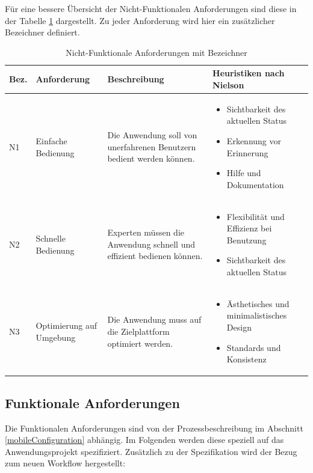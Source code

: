 Für eine bessere Übersicht der Nicht-Funktionalen Anforderungen sind diese in der Tabelle \ref{nonFunctionalRequ} dargestellt. Zu jeder Anforderung wird hier ein zusätzlicher Bezeichner definiert.

\begin{table}
\begin{tabular}{| p{0.7cm} | p{2.2cm} | p{4.5cm} | p{5.5cm}|}
\toprule[2pt] \rowcolor{dunkelgrau}
\hline
  Bez. & Anforderung & Beschreibung & Heuristiken nach Nielson \\
  \hline
  N1 & Einfache \newline Bedienung & Die Anwendung soll von unerfahrenen Benutzern bedient werden können.& \begin{itemize}
          \item Sichtbarkeit des aktuellen Status
          \item Erkennung vor Erinnerung
          \item Hilfe und Dokumentation
  \end{itemize} \\
  \hline
  N2 & Schnelle \newline Bedienung & Experten müssen die Anwendung schnell und effizient bedienen können. & \begin{itemize}
            \item Flexibilität und Effizienz bei Benutzung
            \item Sichtbarkeit des aktuellen Status
    \end{itemize}  \\
  \hline
    N3 & Optimierung auf Umgebung & Die Anwendung muss auf die Zielplattform optimiert werden. &  \begin{itemize}
              \item Ästhetisches und minimalistisches Design
              \item Standards und Konsistenz
      \end{itemize} \\
    \hline
\bottomrule[2pt]
\end{tabular}
\caption{Nicht-Funktionale Anforderungen mit Bezeichner}
\label{nonFunctionalRequ}
\end{table}

\subsection{Funktionale Anforderungen}\label{functionRequ}
Die Funktionalen Anforderungen sind von der Prozessbeschreibung im Abschnitt \ref{mobileConfiguration} abhängig. Im Folgenden werden diese speziell auf das Anwendungsprojekt spezifiziert. Zusätzlich zu der Spezifikation wird der Bezug zum neuen Workflow hergestellt:

